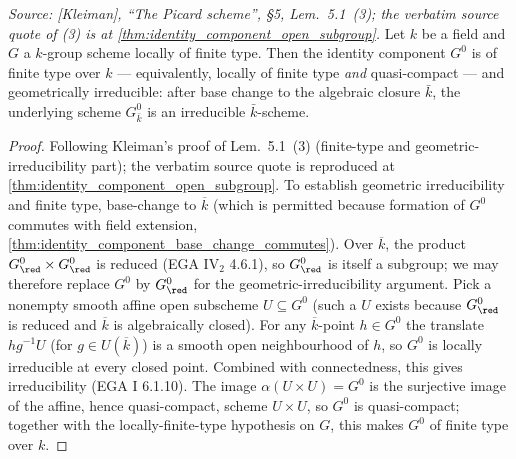 \begin{theorem}

  \label{thm:identity_component_finite_type_geom_irreducible}

  \textit{Source: [Kleiman], ``The Picard scheme'', \S 5,
  Lem.~5.1~(3); the verbatim source quote of (3) is at
  \cref{thm:identity_component_open_subgroup}.}
  Let \(k\) be a field and \(G\) a \(k\)-group scheme locally of finite
  type. Then the identity component \(G^0\) is of finite type over
  \(k\) --- equivalently, locally of finite type \emph{and}
  quasi-compact --- and geometrically irreducible: after base change
  to the algebraic closure \(\bar k\), the underlying scheme
  \(G^0_{\bar k}\) is an irreducible \(\bar k\)-scheme.
\end{theorem}

\begin{proof}
  Following Kleiman's proof of Lem.~5.1~(3) (finite-type and
  geometric-irreducibility part); the verbatim source quote is
  reproduced at \cref{thm:identity_component_open_subgroup}.
  To establish geometric irreducibility and finite type, base-change
  to \(\overline k\) (which is permitted because formation of \(G^0\)
  commutes with field extension,
  \cref{thm:identity_component_base_change_commutes}). Over
  \(\overline k\), the product
  \(G^0_{\red} \times G^0_{\red}\) is reduced (EGA IV\(_2\) 4.6.1), so
  \(G^0_{\red}\) is itself a subgroup; we may therefore replace \(G^0\) by
  \(G^0_{\red}\) for the geometric-irreducibility argument. Pick a
  nonempty smooth affine open subscheme \(U \subseteq G^0\) (such a \(U\)
  exists because \(G^0_{\red}\) is reduced and \(\overline k\) is
  algebraically closed). For any \(\overline k\)-point \(h \in G^0\) the
  translate \(hg^{-1} U\) (for \(g \in U(\overline k)\)) is a smooth open
  neighbourhood of \(h\), so \(G^0\) is locally irreducible at every closed
  point. Combined with connectedness, this gives irreducibility (EGA I
  6.1.10). The image \(\alpha(U \times U) = G^0\) is the surjective image
  of the affine, hence quasi-compact, scheme \(U \times U\), so \(G^0\) is
  quasi-compact; together with the locally-finite-type hypothesis on
  \(G\), this makes \(G^0\) of finite type over \(k\).
\end{proof}

